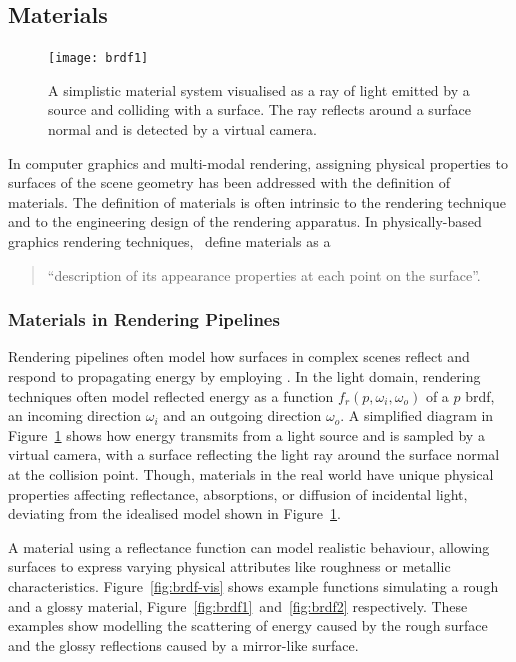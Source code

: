 \subsection{Materials}\label{sec:bg-materials}
\begin{figure}
    \centering
    \texttt{[image: brdf1]}
    \caption[Basic material system in virtual environments]{A simplistic material system visualised as a ray of light emitted by a source and colliding with a surface. The ray reflects around a surface normal and is detected by a virtual camera.}\label{fig:material-vis}
\end{figure}
In computer graphics and multi-modal rendering, assigning physical properties to surfaces of the scene geometry has been addressed with the definition of materials. The definition of materials is often intrinsic to the rendering technique and to the engineering design of the rendering apparatus. In physically-based graphics rendering techniques,~\cite{pharr2023physically} define materials as a
\begin{quotation}
    ``description of its appearance properties at each point on the surface''.
\end{quotation}
\subsubsection{Materials in Rendering Pipelines}
Rendering pipelines often model how surfaces in complex scenes reflect and respond to propagating energy by employing . In the light domain, rendering techniques often model reflected energy as a function $f_r(p, \omega_i, \omega_o)$ of a $p$ \acrshort{brdf}, an incoming direction $\omega_i$ and an outgoing direction $\omega_o$. A simplified diagram in Figure~\ref{fig:material-vis} shows how energy transmits from a light source and is sampled by a virtual camera, with a surface reflecting the light ray around the surface normal at the collision point. Though, materials in the real world have unique physical properties affecting reflectance, absorptions, or diffusion of incidental light, deviating from the idealised model shown in Figure~\ref{fig:material-vis}.\par
A material using a reflectance function can model realistic behaviour, allowing surfaces to express varying physical attributes like roughness or metallic characteristics. Figure~\ref{fig:brdf-vis} shows example functions simulating a rough and a glossy material, Figure~\ref{fig:brdf1}~and~\ref{fig:brdf2} respectively. These examples show  modelling the scattering of energy caused by the rough surface and the glossy reflections caused by a mirror-like surface.\par


